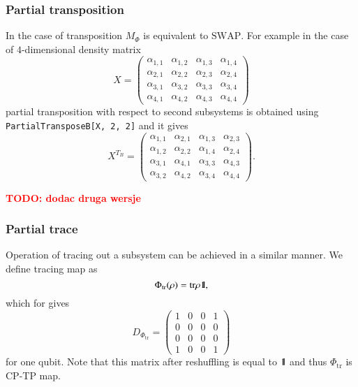 \documentclass[final,5p,times,twocolumn]{elsarticle}
\newcommand{\1}{{\rm 1\hspace{-0.9mm}l}}
\newcommand{\Id}{\1}
\newcommand{\SWAP}{\ensuremath{\mathrm{SWAP}}}
\newcommand{\tr}{\mathrm{tr}}
\newcommand{\todo}[1]{\textcolor{red}{\bf TODO: #1}}
\begin{document}
\subsubsection{Partial transposition}
In the case of transposition $M_\Phi$ is equivalent to \SWAP. For example in the
case of $4$-dimensional density matrix
\begin{equation}
X=\left(
\begin{array}{cccc}
 \alpha_{1,1} & \alpha_{1,2} & \alpha_{1,3} & \alpha_{1,4} \\
 \alpha_{2,1} & \alpha_{2,2} & \alpha_{2,3} & \alpha_{2,4} \\
 \alpha_{3,1} & \alpha_{3,2} & \alpha_{3,3} & \alpha_{3,4} \\
 \alpha_{4,1} & \alpha_{4,2} & \alpha_{4,3} & \alpha_{4,4}
\end{array}
\right)
\end{equation}
partial transposition with respect to second subsystems is obtained using
\verb+PartialTransposeB[X, 2, 2]+ and it gives
\begin{equation}
X^{T_B}=\left(
\begin{array}{cccc}
 \alpha_{1,1} & \alpha_{2,1} & \alpha_{1,3} & \alpha_{2,3} \\
 \alpha_{1,2} & \alpha_{2,2} & \alpha_{1,4} & \alpha_{2,4} \\
 \alpha_{3,1} & \alpha_{4,1} & \alpha_{3,3} & \alpha_{4,3} \\
 \alpha_{3,2} & \alpha_{4,2} & \alpha_{3,4} & \alpha_{4,4}
\end{array}
\right).
\end{equation}

\todo{dodac druga wersje}
\subsubsection{Partial trace}
Operation of tracing out a subsystem can be achieved in a similar manner. We 
define tracing map as
\begin{equation}
\Phi_\mathrm{tr}(\rho) = \tr \rho \Id,
\end{equation}
which for gives
\begin{equation}
D_{\Phi_\mathrm{tr}} =
\left(
\begin{array}{cccc}
 1 & 0 & 0 & 1 \\
 0 & 0 & 0 & 0 \\
 0 & 0 & 0 & 0 \\
 1 & 0 & 0 & 1
\end{array}
\right)
\end{equation}
for one qubit. Note that this matrix after reshuffling is equal to $\Id$ and 
thus $\Phi_\tr$ is CP-TP map.
\end{document}
